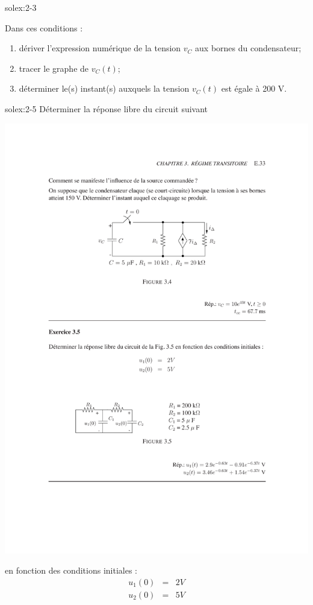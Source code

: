 \begin{exwithsol}{}{solex:2-3}
\begin{enumerate}
\end{enumerate}
Dans ces conditions :
\begin{enumerate}
	\item d\'eriver l'expression num\'erique de la tension $v_C$ aux bornes du condensateur;
	\item tracer le graphe de $v_C(t)$;
	\item d\'eterminer le(s) instant(s) auxquels la tension $v_C(t)$ est \'egale \`a 200 V.
\end{enumerate}
\end{exwithsol}

\begin{exwithsol}{}{solex:2-5}
	\label{ex:2-5}
D\'eterminer la r\'eponse libre du circuit suivant
\begin{center}
	\includegraphics[width=0.8\linewidth]{exercices/ex-3-5}
\end{center}
en fonction des conditions initiales :
\begin{eqnarray*}
	u_1(0)&=&2V\\
	u_2(0)&=&5V\\
\end{eqnarray*}


\end{exwithsol}

